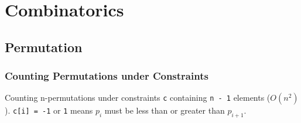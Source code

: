 \section{Combinatorics} %

\subsection{Permutation} %

\subsubsection{Counting Permutations under Constraints} %
Counting n-permutations under constraints {\tt c} containing {\tt n - 1} elements ($O(n^2)$). {\tt c[i] = -1} or {\tt 1} means $p_i$ must be less than or greater than $p_{i+1}$.




